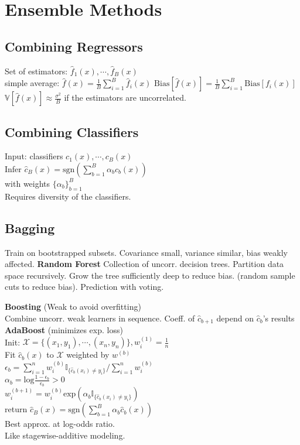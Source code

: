 \section*{Ensemble Methods}
\subsection*{Combining Regressors}
Set of estimators: $\hat{f}_1(x), \cdots, \hat{f}_B(x)$\\
simple average: $\hat{f}(x) = \frac{1}{B}\sum_{i=1}^B\hat{f}_i(x)$
$\mathrm{Bias}[\hat{f}(x)]=\frac{1}{B}\sum_{i=1}^B\mathrm{Bias}[f_i(x)]$\\
$\mathbb{V}[\hat{f}(x)]\approx\frac{\sigma^2}{B}$ if the estimators are uncorrelated.

\subsection*{Combining Classifiers}
Input: classifiers $c_1(x),\cdots,c_B(x)$\\
Infer $\hat{c}_B(x){=}\text{sgn}(\sum_{b=1}^B\alpha_b c_b(x))$\\
with weights $\{\alpha_b\}_{b=1}^B $\\
Requires diversity of the classifiers.

\subsection*{Bagging}
Train on bootstrapped subsets.
Covariance small, variance similar, bias weakly affected.
\textbf{Random Forest}
Collection of uncorr. decision trees.
Partition data space recursively. Grow the tree sufficiently deep to reduce bias. (random sample cuts to reduce bias).
Prediction with voting.

\textbf{Boosting} {(Weak to avoid overfitting)} \\
Combine uncorr. weak learners in sequence.
Coeff. of $\hat{c}_{b+1}$ depend on $\hat{c}_{b}$'s results\\
\textbf{AdaBoost} (minimizes exp. loss)\\
Init: $\mathcal{X}{=}\{(x_1,y_1),\cdots,(x_n,y_n)\}, w_i^{(1)}{=}\frac{1}{n}$\\
Fit  $\hat{c}_b(x)$ to $\mathcal{X}$ weighted by $w^{(b)}$\\
$\epsilon_b=\sum_{i=1}^nw_i^{(b)}\mathbb{I}_{\{\hat c_b(x_i)\not=y_i\}}/\sum_{i=1}^nw_i^{(b)}$\\
$\alpha_b = \mathrm{log}\frac{1-\epsilon_b}{\epsilon_b}>0$\\
$w_i^{(b+1)}=w_i^{(b)}\mathrm{exp}(\alpha_b\mathbb{I}_{\{{\hat c_b(x_i)\not=y_i}\}})$\\
return $\hat{c}_B(x){=}\mathrm{sgn}(\sum_{b{=}1}^B\alpha_b \hat c_b(x))$\\
Best approx. at log-odds ratio. \\
Like stagewise-additive modeling.

